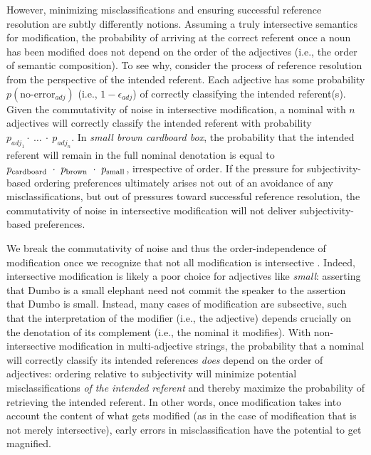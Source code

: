 \documentclass[preprint,authoryear]{elsarticle}\frenchspacing
\begin{document}
However, minimizing misclassifications and ensuring successful reference resolution are subtly differently notions. Assuming a truly intersective semantics for modification, the probability of arriving at the correct referent once a noun has been modified does not depend on the order of the adjectives (i.e., the order of semantic composition). To see why, consider the process of reference resolution from the perspective of the intended referent. Each adjective has some probability $p(\textrm{no-error}_{adj})$ (i.e., $1-\epsilon_{adj}$) of correctly classifying the intended referent(s). Given the commutativity of noise in intersective modification, a nominal with $n$ adjectives will correctly classify the intended referent with probability $p_{adj_1} \cdot\ \ldots\ \cdot\ p_{adj_n}$. In \emph{small brown cardboard box}, the probability that the intended referent will remain in the full nominal denotation is equal to $p_{\footnotesize\textrm{cardboard}} \ \cdot\ p_{\footnotesize\textrm{brown}} \ \cdot\ p_{\footnotesize\textrm{small}}$, irrespective of order. If the pressure for subjectivity-based ordering preferences ultimately arises not out of an avoidance of any misclassifications, but out of pressures toward successful reference resolution, the commutativity of noise in intersective modification will not deliver subjectivity-based preferences.

We break the commutativity of noise and thus the order-independence of modification once we recognize that not all modification is intersective \citep{kamppartee1995,truswell2009,mcnally2016}. Indeed, intersective modification is likely a poor choice for adjectives like \emph{small}: asserting that Dumbo is a small elephant need not commit the speaker to the assertion that Dumbo is small. Instead, many cases of modification are subsective, such that the interpretation of the modifier (i.e., the adjective) depends crucially on the denotation of its complement (i.e., the nominal it modifies). With non-intersective modification in multi-adjective strings, the probability that a nominal will correctly classify its intended references \emph{does} depend on the order of adjectives: ordering relative to subjectivity will minimize potential misclassifications \emph{of the intended referent} and thereby maximize the probability of retrieving the intended referent. In other words, once modification takes into account the content of what gets modified (as in the case of modification that is not merely intersective), early errors in misclassification have the potential to get magnified. %
\end{document}
